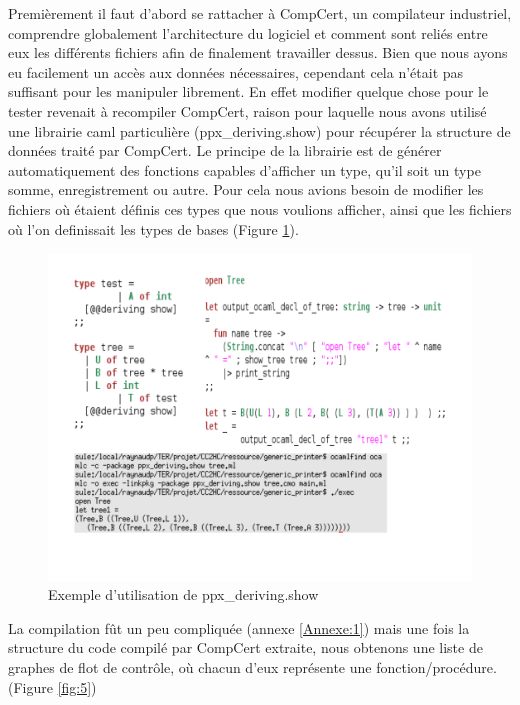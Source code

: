 	Premièrement il faut d'abord se rattacher à CompCert, un compilateur industriel, comprendre globalement l'architecture du logiciel et comment sont reliés entre eux les différents fichiers afin de finalement travailler dessus. 
	Bien que nous ayons eu facilement un accès aux données nécessaires, cependant cela n'était pas suffisant pour les manipuler librement. En effet modifier quelque chose pour le tester revenait à recompiler CompCert, raison pour laquelle nous avons utilisé une librairie caml particulière (ppx\_deriving.show) pour récupérer la structure de données traité par CompCert.
	Le principe de la librairie est de générer automatiquement des fonctions capables d'afficher un type, qu'il soit un type somme, enregistrement ou autre. 
Pour cela nous avions besoin de modifier les fichiers où étaient définis ces types que nous voulions afficher, ainsi que les fichiers où l'on definissait les types de bases (Figure 
\ref{fig:4}).

\begin{figure}[b]

 \includegraphics[width=1.1\textwidth]{ressource_generic_printer.pdf}
\caption{\label{fig:4} Exemple d'utilisation de ppx\_deriving.show }

\end{figure}
\smallbreak
La compilation fût un peu compliquée (annexe \ref{Annexe:1}) mais une fois la structure du code compilé par CompCert extraite, nous obtenons une liste de graphes de flot de contrôle, où chacun d'eux représente une fonction/procédure. (Figure \ref{fig:5})		

